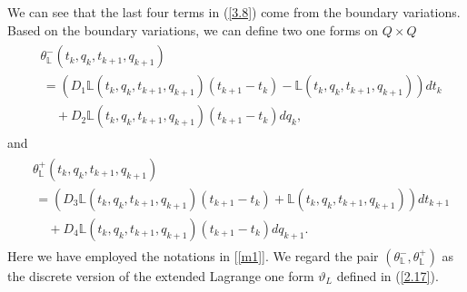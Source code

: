 \documentclass[a4paper,a4paper]{article}
\begin{document}
We can see that the last four terms in (\ref{3.8}) come from the boundary variations.
Based on the
boundary variations, we can define two one forms on $Q\times Q$
\begin{align}
\begin{split}
&\theta_{\mathbb{L}}^{-}(t_{k}, q_{k}, t_{k+1}, q_{k+1})\\
                   &\, =(D_{1}\mathbb{L}(t_{k}, q_{k}, t_{k+1}, q_{k+1})
            (t_{k+1}-t_{k})-\mathbb{L}(t_{k}, q_{k}, t_{k+1}, q_{k+1}))dt_{k}\\
          &\, \quad +D_{2}\mathbb{L}(t_{k}, q_{k}, t_{k+1}, q_{k+1})
                (t_{k+1}-t_{k}) dq_{k}, \label{3.9}
\end{split}
\end{align}
and
\begin{align}
\begin{split}
 &\theta_{\mathbb{L}}^{+}(t_{k}, q_{k}, t_{k+1}, q_{k+1})\\
             &\,    =(D_{3}\mathbb{L}(t_{k}, q_{k}, t_{k+1}, q_{k+1})
            (t_{k+1}-t_{k})+\mathbb{L}(t_{k}, q_{k}, t_{k+1}, q_{k+1}))dt_{k+1}\\
          &\, \quad +D_{4}\mathbb{L}(t_{k}, q_{k}, t_{k+1}, q_{k+1})
                (t_{k+1}-t_{k}) dq_{k+1}. \label{3.10}
\end{split}
\end{align}
Here we have employed the notations in [\ref{m1}]. We regard the
pair
$(\theta_{\mathbb{L}}^{-}, \theta_{\mathbb{L}}^{+})$ as %
the discrete version of the extended Lagrange one form
$\vartheta_{L}$ defined in (\ref{2.17}).
\end{document}
